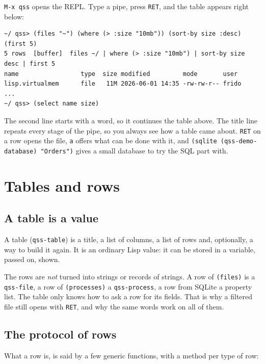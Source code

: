 \documentclass[
  paper=a4, fontsize=11pt, parskip=half, headings=small,
  toc=bibliography, numbers=noenddot, DIV=12
]{scrreprt}
\newcommand{\code}[1]{\texttt{#1}}
\newcommand{\kbd}[1]{\texttt{#1}}
\begin{document}
\kbd{M-x qss} opens the REPL. Type a pipe, press \kbd{RET}, and the table
appears right below:

\begin{Verbatim}
~/ qss> (files "~") (where (> :size "10mb")) (sort-by size :desc) (first 5)
5 rows  [buffer]  files ~/ | where (> :size "10mb") | sort-by size desc | first 5
name                 type  size modified         mode       user
lisp.virtualmem      file   11M 2026-06-01 14:35 -rw-rw-r-- frido
...
~/ qss> (select name size)
\end{Verbatim}

The second line starts with a word, so it continues the table above. The title
line repeats every stage of the pipe, so you always see how a table came about.
\kbd{RET} on a row opens the file, \kbd{a} offers what can be done with it, and
\code{(sqlite (qss-demo-database) "Orders")} gives a small database to try the
SQL part with.

\chapter{Tables and rows}

\section{A table is a value}

A table (\code{qss-table}) is a title, a list of columns, a list of rows and,
optionally, a way to build it again. It is an ordinary Lisp value: it can be
stored in a variable, passed on, shown.

The rows are \emph{not} turned into strings or records of strings. A row of
\code{(files)} is a \code{qss-file}, a row of \code{(processes)} a
\code{qss-process}, a row from SQLite a property list. The table only knows how
to ask a row for its fields. That is why a filtered file still opens with
\kbd{RET}, and why the same words work on all of them.

\section{The protocol of rows}

What a row is, is said by a few generic functions, with a method per type of
row:
\end{document}

